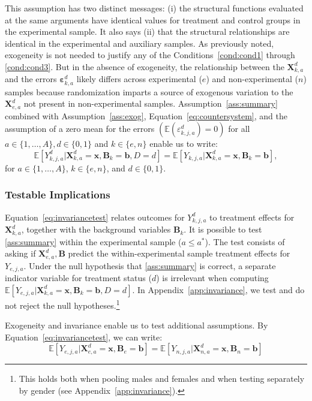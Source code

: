 This assumption has two distinct messages: (i) the structural functions evaluated at the same arguments have identical values for treatment and control groups in the experimental sample. It also says (ii) that the structural relationships are identical in the experimental and auxiliary samples. As previously noted, exogeneity is not needed to justify any of the Conditions~\ref{cond:cond1} through \ref{cond:cond3}. But in the absence of exogeneity, the relationship between the $\bm{X}^d_{k,a}$ and the errors $\bm{\varepsilon}^d_{k,a}$ likely differs across experimental ($e$) and non-experimental ($n$) samples because randomization imparts a source of exogenous variation to the $\bm{X}^d_{e,a}$ not present in non-experimental samples. Assumption~\ref{ass:summary} combined with Assumption~\ref{ass:exog}, Equation~\eqref{eq:countersystem}, and the assumption of a zero mean for the errors $(\mathbb{E}(\varepsilon^d_{k,j,a})=0)$ for all $a \in \{1,\dots,A\}, d \in \{0,1\}$ and $k \in \{e,n\}$ enable us to write:
\begin{equation}\label{eq:invariancetest}
\mathbb{E} \left[ Y_{k,j,a}^d | \bm{X}_{k,a}^d  = \bm{x}, \bm{B}_k = \bm{b}, D = d \right] = \mathbb{E} \left[ Y_{k,j,a} | \bm{X}^d_{k,a}  = \bm{x}, \bm{B}_k = \bm{b} \right],
\end{equation}
for $a \in \{1,\dots,A\}$, $k \in \{e,n\}$, and $d \in \{0,1\}$.

\subsubsection{Testable Implications}

Equation~\eqref{eq:invariancetest} relates outcomes for $Y_{k,j,a}^d$ to treatment effects for $\bm{X}_{k,a}^d$, together with the background variables $\bm{B}_k$. It is possible to test \ref{ass:summary} within the experimental sample ($a \leq a^*$). The test consists of asking if $\bm{X}_{e,a}^d, \bm{B}$ predict the within-experimental sample treatment effects for $Y_{e,j,a}$. Under the null hypothesis that \ref{ass:summary} is correct, a separate indicator variable for treatment status ($d$) is irrelevant when computing $\mathbb{E} \left[ Y_{e,j,a} | \bm{X}_{k,a}^d  = \bm{x}, \bm{B}_k =  \bm{b}, D = d \right]$. In  Appendix~\ref{app:invariance}, we test and do not reject the null hypotheses.\footnote{This holds both when pooling males and females and when testing separately by gender (see  Appendix~\ref{app:invariance}).}

Exogeneity and invariance enable us to test additional assumptions. By Equation~\eqref{eq:invariancetest}, we can write:
\begin{equation}\label{eq:withbetimplication}
\mathbb{E} \left[ Y_{e,j,a} | \bm{X}^d_{e,a} = \bm{x}, \bm{B}_e = \bm{b} \right] = \mathbb{E} \left[ Y_{n,j,a} | \bm{X}^d_{n,a} = \bm{x}, \bm{B}_n = \bm{b} \right]
\end{equation}

